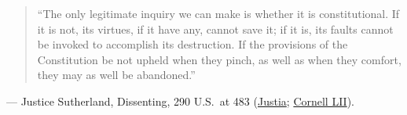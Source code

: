 \documentclass[12pt]{article}
\begin{document}
\begin{quote}
``The only legitimate inquiry we can make is whether it is constitutional. If it is not, its virtues, if it have any, cannot save it; if it is, its faults cannot be invoked to accomplish its destruction. If the provisions of the Constitution be not upheld when they pinch, as well as when they comfort, they may as well be abandoned.''
\end{quote}
\noindent --- Justice Sutherland, Dissenting, 290 U.S.\ at 483 (\href{https://supreme.justia.com/cases/federal/us/290/398/}{Justia}; \href{https://www.law.cornell.edu/supremecourt/text/290/398}{Cornell LII}).
\end{document}
